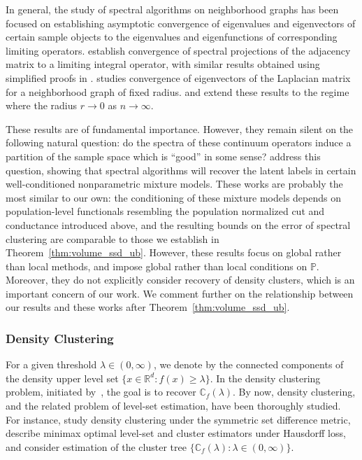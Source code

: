 \documentclass[twoside,11pt]{article}
\newcommand{\Reals}{\mathbb{R}}
\newcommand{\1}{\mathbf{1}}
\newcommand{\Rd}{\Reals^d}
\newcommand{\mbb}[1]{\mathbb{#1}}
\newcommand{\Pbb}{\mathbb{P}}
\begin{document}
In general, the study of spectral algorithms on neighborhood graphs has been focused on establishing asymptotic convergence of eigenvalues and eigenvectors of certain sample objects to the eigenvalues and eigenfunctions of corresponding limiting operators. \citet{koltchinskii2000} establish convergence of spectral projections of the adjacency matrix to a limiting integral operator, with similar results obtained using simplified proofs in \citet{rosasco10}. \citet{vonluxburg2008} studies convergence of eigenvectors of the Laplacian matrix for a neighborhood graph of fixed radius. \citet{belkin07} and \citet{garciatrillos18} extend these results to the regime where the radius $r \to 0$ as $n \to \infty$. 

These results are of fundamental importance. However, they remain silent on the following natural question: do the spectra of these continuum operators induce a partition of the sample space which is ``good'' in some sense? \citet{shi2009,schiebinger2015,garciatrillos19,hoffmann2019} address this question, showing that spectral algorithms will recover the latent labels in certain well-conditioned nonparametric mixture models. These works are probably the most similar to our own: the conditioning of these mixture models depends on population-level functionals resembling the population normalized cut and conductance introduced above, and the resulting bounds on the error of spectral clustering are comparable to those we establish in Theorem~\ref{thm:volume_ssd_ub}. However, these results focus on global rather than local methods, and impose global rather than local conditions on $\Pbb$. Moreover, they do not explicitly consider recovery of density clusters, which is an important concern of our work. We comment further on the relationship between our results and these works after Theorem~\ref{thm:volume_ssd_ub}.

\subsubsection{Density Clustering} 
For a given threshold $\lambda \in (0,\infty)$, we denote by \smash{$\mbb{C}_f(\lambda)$} the connected components of the density upper level set $\{x \in \Rd: f(x) \geq \lambda\}$. In the density clustering problem, initiated by~\cite{hartigan1975}, the goal is to recover $\mbb{C}_{f}(\lambda)$. By now, density clustering, and the related problem of level-set estimation, have been thoroughly studied. For instance, \citet{polonik1995,rigollet2009, rinaldo2010, steinwart2015} study density clustering under the symmetric set difference metric, \citet{tsybakov1997,singh2009,jiang2017} describe minimax optimal level-set and cluster estimators under Hausdorff loss, and \citet{hartigan1981,chaudhuri2010,kpotufe11,balakrishnan2013,steinwart2017,wang2019} consider estimation of the cluster tree $\{\mbb{C}_f(\lambda): \lambda \in (0,\infty)\}$.
\end{document}
